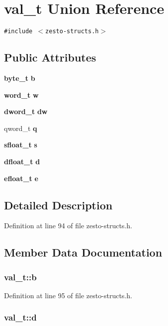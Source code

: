 \section{val\_\-t Union Reference}
\label{unionval__t}
{\tt \#include $<$zesto-structs.h$>$}

\subsection*{Public Attributes}
\begin{CompactItemize}
\item 
{\bf byte\_\-t} {\bf b}
\item 
{\bf word\_\-t} {\bf w}
\item 
{\bf dword\_\-t} {\bf dw}
\item 
qword\_\-t {\bf q}
\item 
{\bf sfloat\_\-t} {\bf s}
\item 
{\bf dfloat\_\-t} {\bf d}
\item 
{\bf efloat\_\-t} {\bf e}
\end{CompactItemize}


\subsection{Detailed Description}


Definition at line 94 of file zesto-structs.h.

\subsection{Member Data Documentation}
\subsubsection[{b}]{ {\bf val\_\-t::b}}\label{unionval__t_62b9463491547980da20f5285235e8ce}




Definition at line 95 of file zesto-structs.h.
\subsubsection[{d}]{ {\bf val\_\-t::d}}\label{unionval__t_c0c77bd2be03a31e9a8935a74069cfdd}




